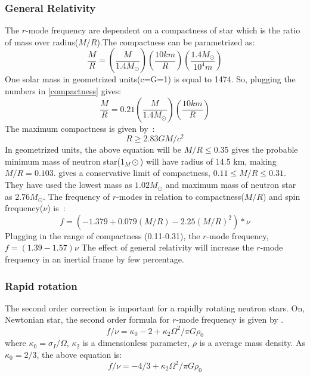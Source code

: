 \documentclass{ttuthes2007}
\begin{document}
\subsubsection{General Relativity}
The $r$-mode frequency are dependent on a compactness of star which is the ratio
of mass over radius($M/R$).The compactness can be parametrized as:
\begin{equation}\label{compactness}
\frac{M}{R}=\left(\frac{M}{1.4M_\odot}\right)\left(\frac{10km}{R}\right)\left(\frac{1.4M_\odot}{10^4m}\right)
\end{equation} 
One solar mass in geometrized units(c=G=1) is equal to 1474. So, plugging the
numbers in \ref{compactness} gives:
\begin{equation}
\frac{M}{R}=0.21\left(\frac{M}{1.4M_\odot}\right)\left(\frac{10km}{R}\right)
\end{equation} 
The maximum compactness is given by~\cite{LATTIMER_2007}:
\begin{equation}
R \geq 2.83GM/c^2
\end{equation}
In geometrized units, the above equation will be $M/R \leq 0.35$
\citet{LATTIMER_2007} gives the probable minimum mass of neutron
star($1_M\odot$) will have radius of 14.5 km, making $M/R=0.103$.
\citet{Idrisy_2015} gives a conservative limit of compactness, $0.11 \leq M/R
\leq 0.31$. They have used the lowest mass as $1.02M_\odot$ and maximum mass of
neutron star as $2.76M_\odot$. The frequency of $r$-modes in relation to
compactness($M/R$) and spin frequency($\nu$) is~\cite{Idrisy_2015}: 
\begin{equation}
f=(-1.379 + 0.079(M/R) - 2.25(M/R)^2)*\nu
\end{equation}  
Plugging in the range of compactness (0.11-0.31), the $r$-mode frequency,
$f=(1.39-1.57)\nu$
The effect of general relativity will increase the $r$-mode frequency in an
inertial frame by few percentage.

\subsubsection{Rapid rotation}
The second order correction is important for a rapidly rotating neutron stars.
On, Newtonian star, the second order formula for $r$-mode frequency is given by 
\cite{Lindblom_1999}.
\begin{equation}
f/\nu=\kappa_0 - 2 + \kappa_2 \Omega^2/\pi G \rho_0
\end{equation}
where $\kappa_0=\sigma_I/\Omega$, $\kappa_2$ is a dimensionless parameter,
$\rho$ is a average mass density.
As $\kappa_0=2/3$, the above equation is:
\begin{equation}
f/\nu = -4/3 + \kappa_2 \Omega^2/\pi G \rho_0
\end{equation}
\end{document}
